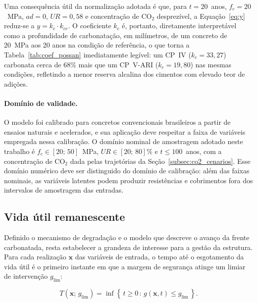 Uma consequência útil da normalização adotada é que, para $t = 20$~anos, $f_c = 20$~MPa, $ad = 0$, $UR = 0{,}58$ e concentração de CO$_2$ desprezível, a Equação~\eqref{eq:y} reduz-se a $y = k_c \cdot k_{ce}$. O coeficiente $k_c$ é, portanto, diretamente interpretável como a profundidade de carbonatação, em milímetros, de um concreto de 20~MPa aos 20 anos na condição de referência, o que torna a Tabela~\ref{tab:coef_possan} imediatamente legível: um CP~IV ($k_c = 33{,}27$) carbonata cerca de 68\% mais que um CP~V-ARI ($k_c = 19{,}80$) nas mesmas condições, refletindo a menor reserva alcalina dos cimentos com elevado teor de adições.

\paragraph{Dom\'inio de validade.} O modelo foi calibrado para concretos convencionais brasileiros a partir de ensaios naturais e acelerados, e sua aplicação deve respeitar a faixa de variáveis empregada nessa calibração. O domínio nominal de amostragem adotado neste trabalho é $f_c \in [20;\,50]$~MPa, $UR \in [20;\,80]\%$ e $t \leq 100$~anos, com a concentração de CO$_2$ dada pelas trajetórias da Seção~\ref{subsec:co2_cenarios}. Esse domínio numérico deve ser distinguido do domínio de calibração: além das faixas nominais, as variáveis latentes podem produzir resistências e cobrimentos fora dos intervalos de amostragem das entradas. 

\subsection{Vida \'util remanescente}
\label{subsec:rul_conceito}

Definido o mecanismo de degradação e o modelo que descreve o avanço da frente carbonatada, resta estabelecer a grandeza de interesse para a gestão da estrutura. Para cada realização $\mathbf{x}$ das variáveis de entrada, o tempo até o esgotamento da vida útil é o primeiro instante em que a margem de segurança atinge um limiar de intervenção $g_{\mathrm{lim}}$:

\begin{equation}
T(\mathbf{x};\, g_{\mathrm{lim}}) = \inf\left\{\, t \geq 0 \,:\, g(\mathbf{x}, t) \leq g_{\mathrm{lim}} \,\right\}.
\label{eq:ttf}
\end{equation}

